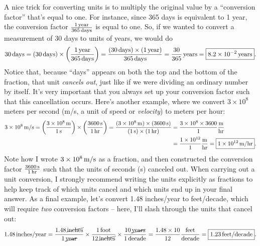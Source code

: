 \documentclass[11pt]{article}
\begin{document}
A nice trick for converting units is to multiply the original value by a ``conversion factor'' that's equal to one. For instance, since 365 days is equivalent to 1 year, the conversion factor $\frac{1 \, {\rm year}}{365 \, {\rm days}}$ is equal to one. So, if we wanted to convert a measurement of 30 days to units of years, we would do
\medskip
\begin{equation}
    30 \, {\rm days} = (30 \, {\rm days}) \times \left(\frac{1 \, {\rm year}}{365 \, {\rm days}}\right) = \frac{(30 \, {\rm days}) \times (1 \, {\rm year})}{365 \, {\rm days}} = \frac{30}{365} \, {\rm years} = \boxed{8.2 \times 10^{-2} \, {\rm years}}.
\end{equation}
\medskip
Notice that, because ``days'' appears on both the top and the bottom of the fraction, that unit \emph{cancels out}, just like if we were dividing an ordinary number by itself. It's very important that you always set up your conversion factor such that this cancellation occurs. Here's another example, where we convert $3 \times 10^8$ meters per second (m/s, a unit of speed or \emph{velocity}) to meters per hour:
\medskip
\begin{align}
    3 \times 10^8 \, {\rm m/s} = \left(\frac{3 \times 10^8 \, {\rm m}}{1 \, {\rm s}}\right) \times \left(\frac{3600 \, {\rm s}}{1 \, {\rm hr}}\right) = \frac{(3\times 10^8 \, {\rm m}) \times (3600 \, {\rm s})}{\rm (1 \, s) \times (1 \, hr)} &= \frac{3 \times 10^8 \times 3600}{\rm 1} \frac{\rm m}{\rm hr} \nonumber \\ &= \frac{1 \times 10^{12}}{1} \frac{\rm m}{\rm hr} = \boxed{1 \times 10^{12} \, {\rm m/hr}}. 
\end{align}
\medskip 
Note how I wrote $3 \times 10^8 \, {\rm m/s}$ as a fraction, and then constructed the conversion factor $\frac{\rm 3600 \, s}{\rm 1 \, hr}$ such that the units of seconds (s) canceled out. When carrying out a unit conversion, I strongly recommend writing the units explicitly as fractions to help keep track of which units cancel and which units end up in your final answer. As a final example, let's convert 1.48 inches/year to feet/decade, which will require \emph{two} conversion factors -- here, I'll slash through the units that cancel out:
\medskip
\begin{equation}
    1.48 \, {\rm inches/year} =  \frac{1.48 \, \cancel{\mathrm{inches}}}{1 \, \cancel{\mathrm{year}}} \times \frac{1 \, \mathrm{foot}}{12 \, \cancel{\mathrm{inches}}} \times \frac{10 \, \cancel{\mathrm{years}}}{1 \, \mathrm{decade}} = \frac{1.48 \times 10}{12} \frac{\rm feet}{\rm decade}= \boxed{1.23 \, {\rm feet/decade}}.
\end{equation}
\bigskip
\end{document}
